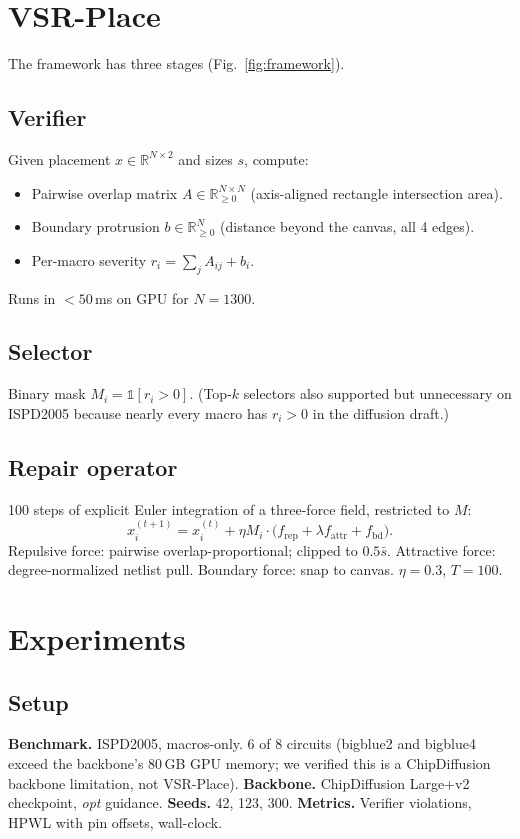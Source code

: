 \documentclass[10pt,twocolumn]{article}
\begin{document}
\section{VSR-Place}

The framework has three stages (Fig.~\ref{fig:framework}).

\subsection{Verifier}
Given placement $x \in \mathbb{R}^{N \times 2}$ and sizes $s$, compute:
\begin{itemize}
\item Pairwise overlap matrix $A \in \mathbb{R}^{N\times N}_{\geq 0}$ (axis-aligned rectangle intersection area).
\item Boundary protrusion $b \in \mathbb{R}^N_{\geq 0}$ (distance beyond the canvas, all 4 edges).
\item Per-macro severity $r_i = \sum_j A_{ij} + b_i$.
\end{itemize}
Runs in $<50$\,ms on GPU for $N=1300$.

\subsection{Selector}
Binary mask $M_i = \mathbb{1}[r_i > 0]$. (Top-$k$ selectors also supported but unnecessary on ISPD2005 because nearly every macro has $r_i > 0$ in the diffusion draft.)

\subsection{Repair operator}
100 steps of explicit Euler integration of a three-force field, restricted to $M$:
\begin{equation}
x_i^{(t+1)} = x_i^{(t)} + \eta M_i \cdot \big( f_{\text{rep}} + \lambda f_{\text{attr}} + f_{\text{bd}} \big).
\end{equation}
Repulsive force: pairwise overlap-proportional; clipped to $0.5\bar{s}$. Attractive force: degree-normalized netlist pull. Boundary force: snap to canvas. $\eta = 0.3$, $T = 100$.

\section{Experiments}

\subsection{Setup}
\textbf{Benchmark.} ISPD2005, macros-only. 6 of 8 circuits (bigblue2 and bigblue4 exceed the backbone's 80\,GB GPU memory; we verified this is a ChipDiffusion backbone limitation, not VSR-Place).
\textbf{Backbone.} ChipDiffusion Large+v2 checkpoint, \emph{opt} guidance.
\textbf{Seeds.} 42, 123, 300.
\textbf{Metrics.} Verifier violations, HPWL with pin offsets, wall-clock.
\end{document}
